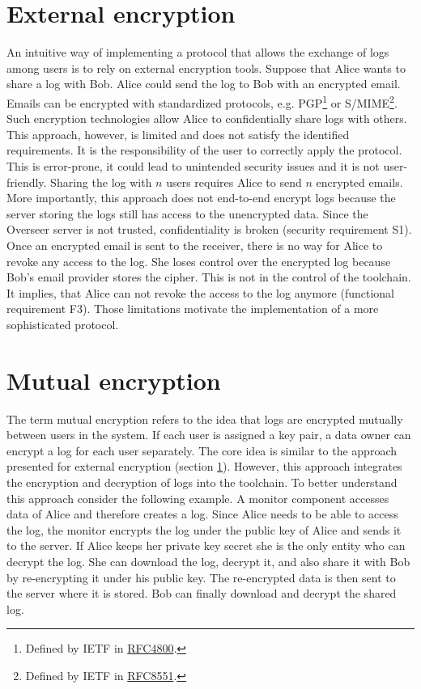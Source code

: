 \documentclass[../main.tex]{subfiles}
\begin{document}
\section{External encryption}
\label{sec:external-encryption}
An intuitive way of implementing a protocol that allows the exchange of logs among users is to rely on external encryption tools.
Suppose that Alice wants to share a log with Bob.
Alice could send the log to Bob with an encrypted email.
Emails can be encrypted with standardized protocols, e.g. PGP\footnote{Defined by IETF in \href{https://www.rfc-editor.org/rfc/rfc4880}{RFC4800}.} or S/MIME\footnote{Defined by IETF in \href{https://www.rfc-editor.org/rfc/rfc8551.html}{RFC8551}.}.
Such encryption technologies allow Alice to confidentially share logs with others.
This approach, however, is limited and does not satisfy the identified requirements.
It is the responsibility of the user to correctly apply the protocol.
This is error-prone, it could lead to unintended security issues and it is not user-friendly.
Sharing the log with $n$ users requires Alice to send $n$ encrypted emails.
More importantly, this approach does not end-to-end encrypt logs because the server storing the logs still has access to the unencrypted data.
Since the Overseer server is not trusted, confidentiality is broken (security requirement S1).
Once an encrypted email is sent to the receiver, there is no way for Alice to revoke any access to the log.
She loses control over the encrypted log because Bob's email provider stores the cipher.
This is not in the control of the toolchain.
It implies, that Alice can not revoke the access to the log anymore (functional requirement F3).
Those limitations motivate the implementation of a more sophisticated protocol.

\section{Mutual encryption}
\label{sec:mutual-encryption}
The term mutual encryption refers to the idea that logs are encrypted mutually between users in the system.
If each user is assigned a key pair, a data owner can encrypt a log for each user separately.
The core idea is similar to the approach presented for external encryption (section \ref{sec:external-encryption}).
However, this approach integrates the encryption and decryption of logs into the toolchain.
To better understand this approach consider the following example.
A monitor component accesses data of Alice and therefore creates a log.
Since Alice needs to be able to access the log, the monitor encrypts the log under the public key of Alice and sends it to the server.
If Alice keeps her private key secret she is the only entity who can decrypt the log.
She can download the log, decrypt it, and also share it with Bob by re-encrypting it under his public key.
The re-encrypted data is then sent to the server where it is stored.
Bob can finally download and decrypt the shared log.
\end{document}
